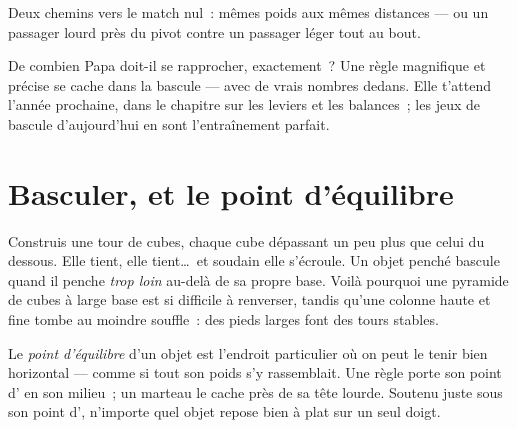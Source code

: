 \begin{omfigure}

{\small Deux chemins vers le match nul~: mêmes poids aux mêmes
distances --- ou un passager lourd près du pivot contre un passager
léger tout au bout.}
\end{omfigure}

\begin{remark}\label{rem:g2:balance-equilibrium:promise}
De combien Papa doit-il se rapprocher, exactement~? Une règle
magnifique et précise se cache dans la bascule --- avec de vrais
nombres dedans. Elle t'attend l'année prochaine, dans le chapitre sur
les leviers et les balances~; les jeux de bascule d'aujourd'hui en
sont l'entraînement parfait.
\end{remark}

\section{Basculer, et le point d'équilibre}

\begin{example}\label{ex:g2:balance-equilibrium:tower}
Construis une tour de cubes, chaque cube dépassant un peu plus que
celui du dessous. Elle tient, elle tient\dots\ et soudain elle
s'écroule. Un objet penché bascule quand il penche \emph{trop loin}
au-delà de sa propre base. Voilà pourquoi une pyramide de cubes à
large base est si difficile à renverser, tandis qu'une colonne haute
et fine tombe au moindre souffle~: des pieds larges font des tours
stables.
\end{example}

\begin{definition}\label{def:g2:balance-equilibrium:point}
Le \emph{point d'équilibre} d'un objet est
l'endroit particulier où on peut le tenir bien horizontal --- comme
si tout son poids s'y rassemblait. Une règle porte son point
d' en son milieu~; un marteau le cache près de sa tête
lourde. Soutenu juste sous son point d', n'importe quel
objet repose bien à plat sur un seul doigt.
\end{definition}

